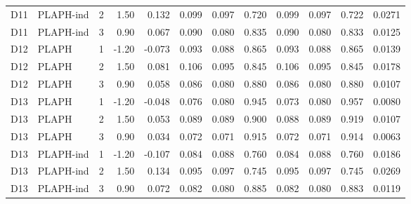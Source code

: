 \begin{longtable}{cllrrrrrrrrr}
D11 & PLAPH-ind & 2 & 1.50 & 0.132 & 0.099 & 0.097 & 0.720 & 0.099 & 0.097 & 0.722 & 0.0271 \\
D11 & PLAPH-ind & 3 & 0.90 & 0.067 & 0.090 & 0.080 & 0.835 & 0.090 & 0.080 & 0.833 & 0.0125 \\
D12 & PLAPH & 1 & -1.20 & -0.073 & 0.093 & 0.088 & 0.865 & 0.093 & 0.088 & 0.865 & 0.0139 \\
D12 & PLAPH & 2 & 1.50 & 0.081 & 0.106 & 0.095 & 0.845 & 0.106 & 0.095 & 0.845 & 0.0178 \\
D12 & PLAPH & 3 & 0.90 & 0.058 & 0.086 & 0.080 & 0.880 & 0.086 & 0.080 & 0.880 & 0.0107 \\
D13 & PLAPH & 1 & -1.20 & -0.048 & 0.076 & 0.080 & 0.945 & 0.073 & 0.080 & 0.957 & 0.0080 \\
D13 & PLAPH & 2 & 1.50 & 0.053 & 0.089 & 0.089 & 0.900 & 0.088 & 0.089 & 0.919 & 0.0107 \\
D13 & PLAPH & 3 & 0.90 & 0.034 & 0.072 & 0.071 & 0.915 & 0.072 & 0.071 & 0.914 & 0.0063 \\
D13 & PLAPH-ind & 1 & -1.20 & -0.107 & 0.084 & 0.088 & 0.760 & 0.084 & 0.088 & 0.760 & 0.0186 \\
D13 & PLAPH-ind & 2 & 1.50 & 0.134 & 0.095 & 0.097 & 0.745 & 0.095 & 0.097 & 0.745 & 0.0269 \\
D13 & PLAPH-ind & 3 & 0.90 & 0.072 & 0.082 & 0.080 & 0.885 & 0.082 & 0.080 & 0.883 & 0.0119 \\
\end{longtable}

